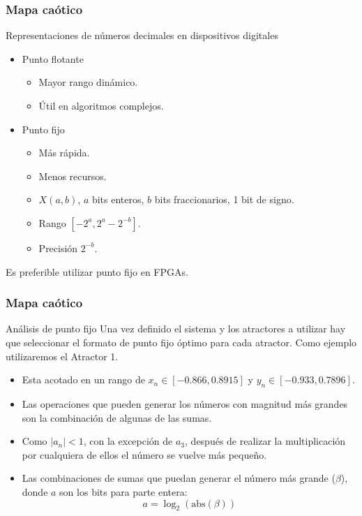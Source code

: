 \documentclass[10pt]{beamer}
\begin{document}
\begin{frame}
    \frametitle{Mapa caótico}
    \begin{block}{Representaciones de números decimales en dispositivos digitales}
        \justifying
         \begin{itemize}
             \item Punto flotante
                 \begin{itemize}
                     \item Mayor rango dinámico.
                     \item Útil en algoritmos complejos.
                 \end{itemize}
             \item Punto fijo
             \begin{itemize}
                     \item Más rápida.
                     \item Menos recursos.
                     \item $X(a,b)$, $a$ bits enteros, $b$ bits fraccionarios, 1 bit de signo.
                     \item Rango $[-2^{a}, 2^{a} - 2^{-b}]$.
                     \item Precisión $2^{-b}$.
                 \end{itemize}
         \end{itemize}
         
         Es preferible utilizar punto fijo en FPGAs.
	\end{block}
\end{frame}


\begin{frame}
    \frametitle{Mapa caótico}
    \begin{block}{Análisis de punto fijo}
        \justifying
        Una vez definido el sistema y los atractores a utilizar hay que seleccionar el formato de punto fijo óptimo para cada atractor. Como ejemplo utilizaremos el Atractor 1. 
        \begin{itemize}
            \item Esta acotado en un rango de $x_{n} \in [-0.866, 0.8915]$ y $y_{n} \in [-0.933, 0.7896]$.
            \item Las operaciones que pueden generar los números con magnitud más grandes son la combinación de algunas de las sumas.
            \item Como $|a_{n}| < 1$, con la excepción de $a_{3}$, después de realizar la multiplicación por cualquiera de ellos el número se vuelve más pequeño.
            \item Las combinaciones de sumas que puedan generar el número más grande ($\beta$), donde $a$ son los bits para parte entera:
            \begin{equation}
                a = \log_{2} ( \text{abs}( \beta ) )
                \label{eq:bits_enteros}
            \end{equation}
        \end{itemize}
    
	\end{block}
\end{frame}
\end{document}

